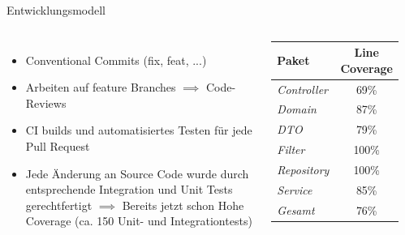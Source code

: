 \documentclass{sdqbeamer}
\begin{document}
    \begin{frame}{Entwicklungsmodell}
        \begin{columns}
            \begin{itemize}
            \item Conventional Commits (fix, feat, ...)
            \item Arbeiten auf feature Branches $\implies$ Code-Reviews
            \item CI builds und automatisiertes Testen für jede Pull Request 
            \item Jede Änderung an Source Code wurde durch entsprechende Integration und Unit Tests gerechtfertigt $\implies$ Bereits jetzt schon Hohe Coverage (ca. 150 Unit- und Integrationtests)
            
        \end{itemize}
            \begin{table}[h]
        \centering
        \renewcommand{\arraystretch}{1.3}
        \begin{tabular}{l|c}
            \textbf{Paket} & \textbf{Line Coverage} \\
            \hline
            \hline
            \textit{Controller}  & 69\% \\
            \textit{Domain}      & 87\% \\
            \textit{DTO}         & 79\% \\
            \textit{Filter}      & 100\% \\
            \textit{Repository}  & 100\% \\
            \textit{Service}     & 85\% \\
            \hline
            \textit{Gesamt}      & 76\% \\
        \end{tabular}
        \label{tab:progress}
    \end{table}
        \end{columns}
        
    \end{frame}
    
\end{document}
